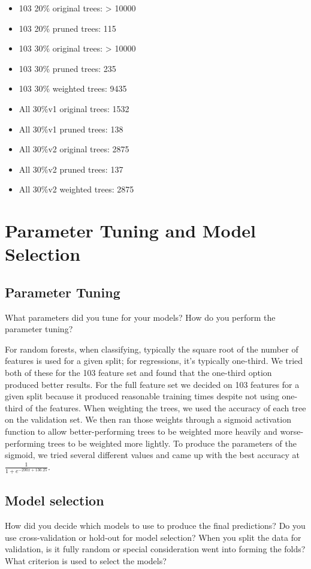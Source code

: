 \documentclass[10pt,a4paper]{article}
\begin{document}
\begin{itemize}
\item 103 20\% original trees: > 10000
\item 103 20\% pruned trees: 115
\item 103 30\% original trees: > 10000
\item 103 30\% pruned trees: 235
\item 103 30\% weighted trees: 9435
\item All 30\%v1 original trees: 1532
\item All 30\%v1 pruned trees: 138
\item All 30\%v2 original trees: 2875
\item All 30\%v2 pruned trees: 137
\item All 30\%v2 weighted trees: 2875
\end{itemize}
\section{Parameter Tuning and Model Selection}
\subsection{Parameter Tuning}
What parameters did you tune for your models? How do you perform the parameter tuning?

For random forests, when classifying, typically the square root of the number of features is used for a given split; for regressions, it's typically one-third.
We tried both of these for the 103 feature set and found that the one-third option produced better results.
For the full feature set we decided on 103 features for a given split because it produced reasonable training times despite not using one-third of the features.
When weighting the trees, we used the accuracy of each tree on the validation set.
We then ran those weights through a sigmoid activation function to allow better-performing trees to be weighted more heavily and worse-performing trees to be weighted more lightly.
To produce the parameters of the sigmoid, we tried several different values and came up with the best accuracy at $\frac{1}{1 + e^{-200x + 136.25}}$.
\subsection{Model selection}
How did you decide which models to use to produce the final predictions?  Do you use cross-validation or hold-out for model selection? When you split the data for validation, is it fully random or special consideration went into forming the folds? What criterion is used to select the models?
\end{document}

